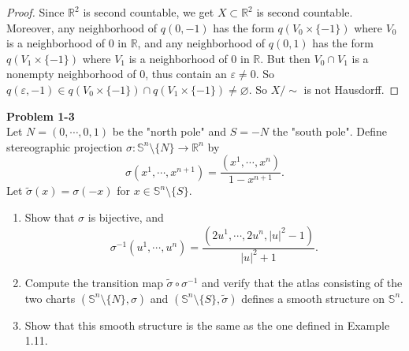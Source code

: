 \documentclass[12pt, a4paper]{article}
\theoremstyle{plain}
\newcommand{\R}{\mathbb{R}}
\newcommand{\set}[1]{\mathbb{#1}}
\def\tilde{\widetilde}
\def\epsilon{\varepsilon}
\newenvironment{problem}[2][Problem]
    { \begin{mdframed}[backgroundcolor=gray!20] \textbf{#1 #2} \\}
    {  \end{mdframed}}
\begin{document}
\begin{proof}
	Since $\R^2$ is second countable, we get $X\subset \R^2$ is second countable. Moreover, any neighborhood of $q(0,-1)$ has the form $q(V_0\times \{-1\})$ where $V_0$ is a neighborhood of $0$ in $\R$, and any neighborhood of $q(0,1)$ has the form $q(V_1\times \{-1\})$ where $V_1$ is a neighborhood of $0$ in $\R$. But then $V_0\cap V_1$ is a nonempty neighborhood of $0$, thus contain an $\epsilon\neq 0$. So $q(\epsilon,-1)\in  q(V_0\times \{-1\})\cap q(V_1\times \{-1\})\neq \varnothing$. So $X/\sim$ is not Hausdorff.
	\end{proof}

\pagebreak

\begin{problem}{1-3}
    Let $N=(0,\cdots,0,1)$ be the "north pole" and $S=-N$ the "south pole". Define stereographic projection $\sigma\colon \set{S}^n\setminus\{N\}\to \R^n$ by
    \[
    \sigma(x^1,\cdots,x^{n+1})=\frac{(x^1,\cdots,x^n)}{1-x^{n+1}}.
    \]
    Let $\tilde\sigma(x)=\sigma(-x)$ for $x\in \set{S}^n\setminus\{S\}$.
    \begin{enumerate}[label=(\roman*)]
        \item Show that $\sigma$ is bijective, and
        \[
        \sigma^{-1}(u^1,\cdots,u^n)=\frac{(2u^1,\cdots,2u^n,|u|^2-1)}{|u|^2+1}.
        \]
        \item Compute the transition map $\tilde\sigma\circ \sigma^{-1}$ and verify that the atlas consisting of the two charts $(\set{S}^n\setminus\{N\},\sigma)$ and $(\set{S}^n\setminus\{S\},\tilde\sigma)$ defines a smooth structure on $\set{S}^n$.
        \item Show that this smooth structure is the same as the one defined in Example 1.11.
    \end{enumerate}
\end{problem}   
\end{document}

